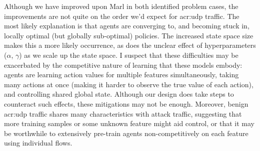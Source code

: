 Although we have improved upon Marl in both identified problem cases, the improvements are not quite on the order we'd expect for \gls{acr:udp} traffic.
The most likely explanation is that agents are converging to, and becoming stuck in, locally optimal (but globally sub-optimal) policies.
The increased state space size makes this a more likely occurrence, as does the unclear effect of hyperparameters ($\alpha$, $\gamma$) as we scale up the state space.
I suspect that these difficulties may be exacerbated by the competitive nature of learning that these models embody: agents are learning action values for multiple features simultaneously, taking many actions at once (making it harder to observe the true value of each action), and controlling shared global state.
Although our design does take steps to counteract such effects, these mitigations may not be enough.
Moreover, benign \gls{acr:udp} traffic shares many characteristics with attack traffic, suggesting that more training samples or some unknown feature might aid control, or that it may be worthwhile to extensively pre-train agents non-competitively on each feature using individual flows.


